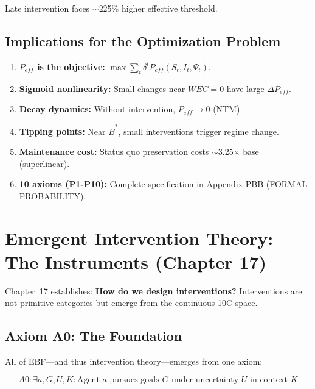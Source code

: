 Late intervention faces $\sim$225\% higher effective threshold.

\subsection{Implications for the Optimization Problem}

\begin{enumerate}[nosep]
\item \textbf{$P_{eff}$ is the objective:} $\max \sum_t \delta^t P_{eff}(S_t, I_t, \Psi_t)$.
\item \textbf{Sigmoid nonlinearity:} Small changes near $WEC = 0$ have large $\Delta P_{eff}$.
\item \textbf{Decay dynamics:} Without intervention, $P_{eff} \to 0$ (NTM).
\item \textbf{Tipping points:} Near $\bar{B}^*$, small interventions trigger regime change.
\item \textbf{Maintenance cost:} Status quo preservation costs $\sim$3.25$\times$ base (superlinear).
\item \textbf{10 axioms (P1-P10):} Complete specification in Appendix PBB (FORMAL-PROBABILITY).
\end{enumerate}

\section{Emergent Intervention Theory: The Instruments (Chapter 17)}
\label{sec:mp-eit}

Chapter~17 establishes: \textbf{How do we design interventions?} Interventions are not primitive categories but emerge from the continuous 10C space.

\subsection{Axiom A0: The Foundation}

All of EBF---and thus intervention theory---emerges from one axiom:

\begin{equation}
\boxed{
A0: \exists a, G, U, K: \text{Agent } a \text{ pursues goals } G \text{ under uncertainty } U \text{ in context } K
}
\label{eq:mp-axiom-a0}
\end{equation}

